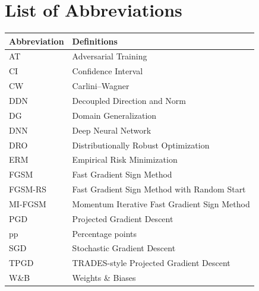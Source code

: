 \chapter*{List of Abbreviations}

\begin{longtable}{|p{3cm}|p{10cm}|}
\hline
\textbf{Abbreviation} & \textbf{Definitions} \\
\hline
AT & Adversarial Training \\
\hline
CI & Confidence Interval \\
\hline
CW & Carlini--Wagner \\
\hline
DDN & Decoupled Direction and Norm \\
\hline
DG & Domain Generalization \\
\hline
DNN & Deep Neural Network \\
\hline
DRO & Distributionally Robust Optimization \\
\hline
ERM & Empirical Risk Minimization \\
\hline
FGSM & Fast Gradient Sign Method \\
\hline
FGSM-RS & Fast Gradient Sign Method with Random Start \\
\hline
MI-FGSM & Momentum Iterative Fast Gradient Sign Method \\
\hline
PGD & Projected Gradient Descent \\
\hline
pp & Percentage points \\
\hline
SGD & Stochastic Gradient Descent \\
\hline
TPGD & TRADES-style Projected Gradient Descent \\
\hline
W\&B & Weights \& Biases \\
\hline


\end{longtable}


